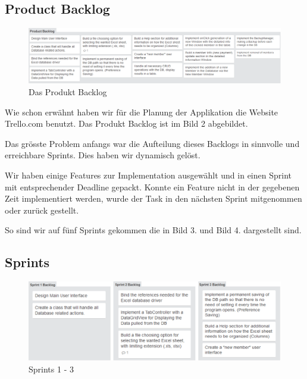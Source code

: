 \documentclass{article}
\begin{document}
\subsection{Product Backlog}
\begin{figure}[h]
		\begin{center}
			\centering
			\includegraphics[width=0.8\paperwidth]{ProductBacklog1}
			\caption{Das Produkt Backlog}
		\end{center}
	\end{figure}
	
Wie schon erwähnt haben wir für die Planung der Applikation die Website Trello.com benutzt. Das Produkt Backlog ist im Bild 2 abgebildet.

Das grösste Problem anfangs war die Aufteilung dieses Backlogs in sinnvolle und erreichbare Sprints. Dies haben wir dynamisch gelöst.

Wir haben einige Features zur Implementation ausgewählt und in einen Sprint mit entsprechender Deadline gepackt. Konnte ein Feature nicht in der gegebenen Zeit implementiert werden, wurde der Task in den nächsten Sprint mitgenommen oder zurück gestellt.

So sind wir auf fünf Sprints gekommen die in Bild 3. und Bild 4. dargestellt sind.

\newpage


\subsection{Sprints}
\begin{figure}[h]
	\centering 
	\includegraphics[width=0.6\paperwidth]{Sprint1-3}
	\caption{Sprints 1 - 3}
\end{figure}
\end{document}
